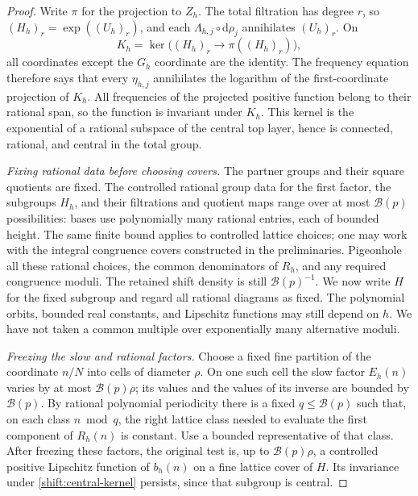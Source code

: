 \begin{proof}
Write $\pi$ for the projection to $Z_h$.  The total filtration
has degree $r$, so $(H_h)_r=\exp((U_h)_r)$, and each
$\Lambda_{h,j}\circ\mathrm d\rho_j$ annihilates $(U_h)_r$.
On
\begin{equation}\label{shift:central-kernel}
 K_h=\ker\bigl((H_h)_r\longrightarrow\pi((H_h)_r)\bigr),
\end{equation}
all coordinates except the $G_h$ coordinate are the identity.
The frequency equation therefore says that every $\eta_{h,j}$
annihilates the logarithm of the first-coordinate projection of $K_h$.
All frequencies of the projected positive function belong to their
rational span, so the function is invariant under $K_h$.
This kernel is the exponential of a rational subspace of the central
top layer, hence is connected, rational, and central in the total group.

\emph{Fixing rational data before choosing covers.}
The partner groups and their square quotients are fixed.
The controlled rational group data for the first factor, the
subgroups $H_h$, and their filtrations and quotient maps range over
at most $\mathcal B(p)$ possibilities: bases use polynomially
many rational entries, each of bounded height.
The same finite bound applies to controlled lattice choices;
one may work with the integral congruence covers constructed in
the preliminaries.  Pigeonhole all these rational choices, the
common denominators of $R_h$, and any required congruence moduli.
The retained shift density is still $\mathcal B(p)^{-1}$.
We now write $H$ for the fixed subgroup and regard all rational
diagrams as fixed.  The polynomial orbits, bounded real constants,
and Lipschitz functions may still depend on $h$.
We have not taken a common multiple over exponentially many
alternative moduli.

\emph{Freezing the slow and rational factors.}
Choose a fixed fine partition of the coordinate $n/N$ into cells
of diameter $\rho$.  On one such cell the slow factor $E_h(n)$
varies by at most $\mathcal B(p)\rho$; its values and the values
of its inverse are bounded by $\mathcal B(p)$.
By rational polynomial periodicity there is a fixed
$q\leq\mathcal B(p)$ such that, on each class $n\bmod q$,
the right lattice class needed to evaluate the first component
of $R_h(n)$ is constant.  Use a bounded representative of that
class.  After freezing these factors, the original test is,
up to $\mathcal B(p)\rho$, a controlled positive Lipschitz
function of $b_h(n)$ on a fine lattice cover of $H$.
Its invariance under \eqref{shift:central-kernel} persists,
since that subgroup is central.


\end{proof}
